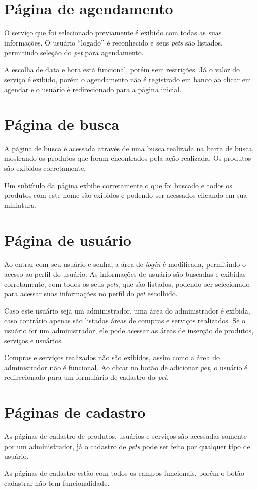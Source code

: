 \section{Página de agendamento}
O serviço que foi selecionado previamente é exibido com todas as suas informações. O usuário “logado” é reconhecido e seus \emph{pets} são listados, permitindo seleção do \emph{pet} para agendamento.

A escolha de data e hora está funcional, porém sem restrições. Já o valor do serviço é exibido, porém o agendamento não é registrado em banco ao clicar em agendar e o usuário é redirecionado para a página inicial.

\section{Página de busca}
A página de busca é acessada através de uma busca realizada na barra de busca, mostrando os produtos que foram encontrados pela ação realizada. Os produtos são exibidos corretamente.

Um subtítulo da página exbibe corretamente o que foi buscado e todos os produtos com este nome são exibidos e podendo ser acessados clicando em sua miniatura.

\section{Página de usuário}
Ao entrar com seu usuário e senha, a área de \emph{login} é modificada, permitindo o acesso ao perfil do usuário. As informações de usuário são buscadas e exibidas corretamente, com todos os seus \emph{pets}, que são listados, podendo ser selecionado para acessar suas informações no perfil do \emph{pet} escolhido.

Caso este usuário seja um administrador, uma área do administrador é exibida, caso contrário apenas são listadas áreas de compras e serviços realizados. Se o usuário for um administrador, ele pode acessar as áreas de inserção de produtos, serviços e usuários.

Compras e serviços realizados não são exibidos, assim como a área do administrador não é funcional. Ao clicar no botão de adicionar \emph{pet}, o usuário é redirecionado para um formulário de cadastro do \emph{pet}.

\section{Páginas de cadastro}
As páginas de cadastro de produtos, usuários e serviços são acessadas somente por um administrador, já o cadastro de \emph{pets} pode ser feito por qualquer tipo de usuário.

As páginas de cadastro estão com todos os campos funcionais, porém o botão cadastrar não tem funcionalidade.























